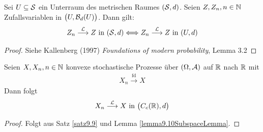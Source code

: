 \begin{lemma}\label{lemma9.10SubspaceLemma}\enter
	Sei $U\subseteq\S$ ein Unterraum des metrischen Raumes $(\S,d)$.
	Seien $Z,Z_n,n\in\N$ Zufallsvariablen in $\big(U,\B_d(U)\big)$.
	Dann gilt:
	\begin{align*}
		Z_n\overset{\L}{\longrightarrow} Z\text{ in }(\S,d)
		\Longleftrightarrow
		Z_n\overset{\L}{\longrightarrow} Z\text{ in }(U,d)
	\end{align*}
\end{lemma}

\begin{proof}
	Siehe Kallenberg (1997) \textit{Foundations of modern probability}, Lemma 3.2
\end{proof}

\begin{korollar}\label{korollar9.11}
	Seien $X,X_n,n\in\N$ konvexe stochastische Prozesse über $(\Omega,\A)$ auf $\R$ nach $\R$ mit 
	\begin{align*}
		X_n\overset{\text{fd}}{\longrightarrow}X
	\end{align*}
	Dann folgt
	\begin{align*}
		X_n\overset{\L}{\longrightarrow} X\text{ in }\big(C_c(\R),d\big)
	\end{align*}
\end{korollar}

\begin{proof}
	Folgt aus Satz \ref{satz9.9} und Lemma \ref{lemma9.10SubspaceLemma}.
\end{proof}